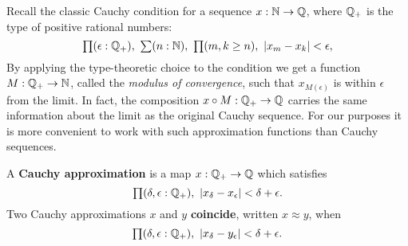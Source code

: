 Recall the classic Cauchy condition for a sequence $x : \mathbb{N} \to \mathbb{Q}$, where $\mathbb{Q}_{+}$ is the
type of positive rational numbers:
%
\[ \prd{\epsilon : \Qp} \sm{n : \N} \prd{m, k \geq n} |x_m - x_k| < \epsilon, \]
%
By applying the type-theoretic choice to the condition we get a function $M : \mathbb{Q}_{+} \to \mathbb{N}$,
called the \emph{modulus of convergence}, such that $x_{M(\epsilon)}$ is within $\epsilon$
from the limit. In fact, the composition $x \circ M : \mathbb{Q}_{+} \to \mathbb{Q}$ carries the same
information about the limit as the original Cauchy sequence. For our purposes it is more
convenient to work with such approximation functions than Cauchy sequences.

\begin{defn}\label{defn:cauchy-approximation}
  A \textbf{Cauchy approximation} is a map $x : \mathbb{Q}_{+} \to \mathbb{Q}$ which satisfies
  \begin{equation}
    \label{eq:cauchy-approx}
    \prd{\delta, \epsilon :\Qp} |x_\delta - x_\epsilon| < \delta + \epsilon.
  \end{equation}
  Two Cauchy approximations $x$ and $y$ \textbf{coincide}, written $x \approx y$, when
  \begin{equation}
    \label{eq:cauchy-coincide}
    \prd{\delta, \epsilon:\Qp} |x_\delta - y_\epsilon| < \delta + \epsilon.
  \end{equation}
\end{defn}

